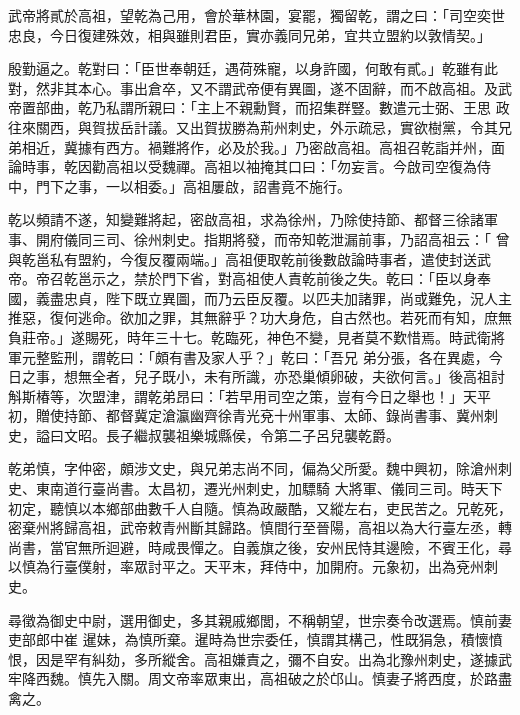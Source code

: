 \begin{pinyinscope}
 武帝將貳於高祖，望乾為己用，會於華林園，宴罷，獨留乾，謂之曰：「司空奕世忠良，今日復建殊效，相與雖則君臣，實亦義同兄弟，宜共立盟約以敦情契。」



 殷勤逼之。乾對曰：「臣世奉朝廷，遇荷殊寵，以身許國，何敢有貳。」乾雖有此對，然非其本心。事出倉卒，又不謂武帝便有異圖，遂不固辭，而不啟高祖。及武帝置部曲，乾乃私謂所親曰：「主上不親勳賢，而招集群豎。數遣元士弼、王思
 政往來關西，與賀拔岳計議。又出賀拔勝為荊州刺史，外示疏忌，實欲樹黨，令其兄弟相近，冀據有西方。禍難將作，必及於我。」乃密啟高祖。高祖召乾詣并州，面論時事，乾因勸高祖以受魏禪。高祖以袖掩其口曰：「勿妄言。今啟司空復為侍中，門下之事，一以相委。」高祖屢啟，詔書竟不施行。



 乾以頻請不遂，知變難將起，密啟高祖，求為徐州，乃除使持節、都督三徐諸軍事、開府儀同三司、徐州刺史。指期將發，而帝知乾泄漏前事，乃詔高祖云：「
 曾與乾邕私有盟約，今復反覆兩端。」高祖便取乾前後數啟論時事者，遣使封送武帝。帝召乾邕示之，禁於門下省，對高祖使人責乾前後之失。乾曰：「臣以身奉國，義盡忠貞，陛下既立異圖，而乃云臣反覆。以匹夫加諸罪，尚或難免，況人主推惡，復何逃命。欲加之罪，其無辭乎？功大身危，自古然也。若死而有知，庶無負莊帝。」遂賜死，時年三十七。乾臨死，神色不變，見者莫不歎惜焉。時武衛將軍元整監刑，謂乾曰：「頗有書及家人乎？」乾曰：「吾兄
 弟分張，各在異處，今日之事，想無全者，兒子既小，未有所識，亦恐巢傾卵破，夫欲何言。」後高祖討斛斯椿等，次盟津，謂乾弟昂曰：「若早用司空之策，豈有今日之舉也！」天平初，贈使持節、都督冀定滄瀛幽齊徐青光兗十州軍事、太師、錄尚書事、冀州刺史，謚曰文昭。長子繼叔襲祖樂城縣侯，令第二子呂兒襲乾爵。



 乾弟慎，字仲密，頗涉文史，與兄弟志尚不同，偏為父所愛。魏中興初，除滄州刺史、東南道行臺尚書。太昌初，遷光州刺史，加驃騎
 大將軍、儀同三司。時天下初定，聽慎以本鄉部曲數千人自隨。慎為政嚴酷，又縱左右，吏民苦之。兄乾死，密棄州將歸高祖，武帝敕青州斷其歸路。慎間行至晉陽，高祖以為大行臺左丞，轉尚書，當官無所迴避，時咸畏憚之。自義旗之後，安州民恃其邊險，不賓王化，尋以慎為行臺僕射，率眾討平之。天平末，拜侍中，加開府。元象初，出為兗州刺史。



 尋徵為御史中尉，選用御史，多其親戚鄉閭，不稱朝望，世宗奏令改選焉。慎前妻吏部郎中崔
 暹妹，為慎所棄。暹時為世宗委任，慎謂其構己，性既狷急，積懷憤恨，因是罕有糾劾，多所縱舍。高祖嫌責之，彌不自安。出為北豫州刺史，遂據武牢降西魏。慎先入關。周文帝率眾東出，高祖破之於邙山。慎妻子將西度，於路盡禽之。




\end{pinyinscope}
